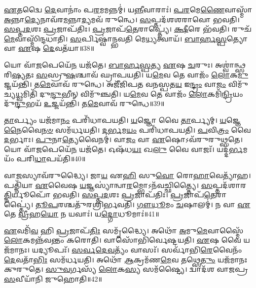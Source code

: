 \-\ul{𑌏}\-𑌤𑌦𑍍𑌵𑍈 \ul{𑌦𑍇}\-𑌵𑌾𑌨𑌾𑌂॑ 𑌪\-\ul{𑌰}\-𑌮𑌮𑌨𑍍𑌨𑌮𑍍॑।
𑌯\-\ul{𑌨𑍍𑌨𑍀}\-𑌵𑌾𑌰𑌾𑌃॑।
\-\ul{𑌪}\-\-\ul{𑌰}\-𑌮𑍇\-\ul{𑌣𑍈}\-𑌵𑌾𑌸𑍍𑌮𑌾᳴ \ul{𑌅}\-𑌨𑍍𑌨𑌾\-\ul{𑌦𑍍𑌯𑍇}\-𑌨𑌾𑌵᳴𑌰\-\ul{𑌮}\-𑌨𑍍𑌨𑌾\-\ul{𑌦𑍍𑌯}\-𑌮𑌵᳴ 𑌰𑍁𑌨𑍍𑌧𑍇।
\-\ul{𑌸}\-𑌪𑍍𑌤𑌦᳴𑌶𑌶𑌰𑌾𑌵𑍋 𑌭𑌵𑌤𑌿।
\-\ul{𑌸}\-\-\ul{𑌪𑍍𑌤}\-\-\ul{𑌦}\-𑌶𑌃 \ul{𑌪𑍍𑌰}\-𑌜𑌾\-𑌪᳴𑌤𑌿𑌃।
\-\ul{𑌪𑍍𑌰}\-𑌜𑌾𑌪᳴\-\ul{𑌤𑍇}\-𑌰𑌾𑌪𑍍𑌤𑍍𑌯𑍇॑।
\-\ul{𑌕𑍍𑌷𑍀}\-𑌰𑍇 𑌭᳴𑌵𑌤𑌿।
𑌰𑍁𑌚᳴\-\ul{𑌮𑍇}\-𑌵𑌾𑌸𑍍𑌮𑌿᳴𑌨𑍍𑌦𑌧𑌾𑌤𑌿।
\-\ul{𑌸}\-𑌰𑍍𑌪𑌿𑌷𑍍𑌵𑌾॑𑌨𑍍𑌭𑌵𑌤𑌿 𑌮𑍇\-\ul{𑌧𑍍𑌯}\-𑌤𑍍𑌵𑌾𑌯᳴।
\-\ul{𑌬𑌾}\-\-\ul{𑌰𑍍}\-\-\ul{𑌹}\-\-\ul{𑌸𑍍𑌪}\-𑌤𑍍𑌯𑍋 𑌵𑌾 \ul{𑌏}\-𑌷 \ul{𑌦𑍇}\-𑌵𑌤᳴𑌯𑌾॥38॥

𑌯𑍋 𑌵𑌾᳴\-\ul{𑌜}\-𑌪𑍇𑌯𑍇᳴\-\ul{𑌨} 𑌯𑌜᳴𑌤𑍇।
\-\ul{𑌬𑌾}\-\-\ul{𑌰𑍍}\-\-\ul{𑌹}\-\-\ul{𑌸𑍍𑌪}\-𑌤𑍍𑌯 \ul{𑌏}\-𑌷 \ul{𑌚}\-𑌰𑍁𑌃।
𑌅𑌶𑍍𑌵𑌾॑𑌨𑍍𑌥𑍍𑌸𑌰𑌿\-\ul{𑌷𑍍𑌯}\-𑌤𑌃 \ul{𑌸}\-𑌸𑍍𑌰𑍁\-\ul{𑌷}\-𑌶𑍍𑌚𑌾𑌵᳴ 𑌘𑍍𑌰𑌾𑌪𑌯𑌤𑌿।
𑌯\-\ul{𑌮𑍇}\-𑌵 𑌤𑍇 𑌵𑌾𑌜𑌂᳴ \ul{𑌲𑍋}\-𑌕\-\ul{𑌮𑍁}\-𑌜𑍍𑌜𑌯᳴𑌨𑍍𑌤𑌿।
𑌤\-\ul{𑌮𑍇}\-𑌵𑌾𑌵᳴ 𑌰𑍁𑌨𑍍𑌧𑍇।
𑌅𑌜𑍀᳴𑌜𑌿𑌪𑌤 𑌵𑌨𑌸𑍍𑌪𑌤\-\ul{𑌯} 𑌇\-\ul{𑌨𑍍𑌦𑍍𑌰𑌂} 𑌵𑌾\-\ul{𑌜𑌂} 𑌵𑌿𑌮𑍁᳴𑌚𑍍𑌯\-\ul{𑌧𑍍𑌵}\-𑌮𑌿𑌤𑌿᳴ 𑌦𑍁\-\ul{𑌨𑍍𑌦𑍁}\-𑌭𑍀𑌨𑍍 𑌵𑌿𑌮𑍁᳴𑌞𑍍𑌚𑌤𑌿।
𑌯\-\ul{𑌮𑍇}\-𑌵 𑌤𑍇 𑌵𑌾𑌜𑌂᳴ \ul{𑌲𑍋}\-𑌕𑌮𑌿᳴\-\ul{𑌨𑍍𑌦𑍍𑌰𑌿}\-𑌯𑌂 𑌦𑍁᳴\-\ul{𑌨𑍍𑌦𑍁}\-𑌭𑌯᳴ \ul{𑌉}\-𑌜𑍍𑌜𑌯᳴𑌨𑍍𑌤𑌿।
𑌤\-\ul{𑌮𑍇}\-𑌵𑌾𑌵᳴ 𑌰𑍁𑌨𑍍𑌧𑍇॥39॥

\-\ul{𑌤𑌾}\-𑌰𑍍𑌪𑍍𑌯𑌂 𑌯𑌜᳴𑌮𑌾\-\ul{𑌨𑌂} 𑌪𑌰𑌿᳴𑌧𑌾𑌪𑌯𑌤𑌿।
\-\ul{𑌯}\-𑌜𑍍𑌞𑍋 𑌵𑍈 \ul{𑌤𑌾}\-𑌰𑍍𑌪𑍍𑌯𑌮𑍍।
\-\ul{𑌯}\-𑌜𑍍𑌞𑍇\-\ul{𑌨𑍈}\-𑌵𑍈\-\ul{𑌨}\-\-\ul{𑍞} 𑌸𑌮᳴𑌰𑍍𑌧𑌯𑌤𑌿।
\-\ul{𑌦}\-\-\ul{𑌰𑍍𑌭}\-𑌮\-\ul{𑌯𑌂} 𑌪𑌰𑌿᳴𑌧𑌾𑌪𑌯𑌤𑌿।
\-\ul{𑌪}\-𑌵𑌿\-\ul{𑌤𑍍𑌰𑌂} 𑌵𑍈 \ul{𑌦}\-𑌰𑍍𑌭𑌾𑌃।
\-\ul{𑌪𑍁}\-𑌨𑌾\-\ul{𑌤𑍍𑌯𑍇}\-𑌵𑍈𑌨𑌮𑍍॑।
𑌵𑌾\-\ul{𑌜𑌂} 𑌵𑌾 \ul{𑌏}\-𑌷𑍋\-𑌽𑌵᳴𑌰𑍁𑌰𑍁𑌥𑍍𑌸𑌤𑍇।
𑌯𑍋 𑌵𑌾᳴\-\ul{𑌜}\-𑌪𑍇𑌯𑍇᳴\-\ul{𑌨} 𑌯𑌜᳴𑌤𑍇।
𑌓𑌷᳴𑌧\-\ul{𑌯𑌃} 𑌖\-\ul{𑌲𑍁} 𑌵𑍈 𑌵𑌾𑌜𑌃᳴।
𑌯𑌦𑍍𑌦᳴\-\ul{𑌰𑍍𑌭}\-𑌮𑌯𑌂᳴ 𑌪𑌰𑌿\-\ul{𑌧𑌾}\-𑌪𑌯᳴𑌤𑌿॥40॥

𑌵𑌾\-\ul{𑌜}\-𑌸𑍍𑌯𑌾𑌵᳴𑌰𑍁𑌦𑍍𑌧𑍍𑌯𑍈।
𑌜𑌾\-\ul{𑌯} 𑌏\-\ul{𑌹𑌿} 𑌸𑍁\-\ul{𑌵𑍋} 𑌰𑍋\-\ul{𑌹𑌾}\-𑌵𑍇𑌤𑍍𑌯𑌾᳴𑌹।
𑌪𑌤𑍍𑌨𑌿᳴𑌯𑌾 \ul{𑌏}\-𑌵𑍈𑌷 \ul{𑌯}\-𑌜𑍍𑌞𑌸𑍍𑌯𑌾॑𑌨𑍍𑌵𑌾\-\ul{𑌰}\-𑌮𑍍𑌭𑍋\-𑌽𑌨᳴𑌵𑌚𑍍𑌛𑌿𑌤𑍍𑌤𑍍𑌯𑍈।
\-\ul{𑌸}\-𑌪𑍍𑌤𑌦᳴𑌶𑌾𑌰\-\ul{𑌤𑍍𑌨𑌿}\-𑌰𑍍𑌯𑍂𑌪𑍋᳴ 𑌭𑌵𑌤𑌿।
\-\ul{𑌸}\-\-\ul{𑌪𑍍𑌤}\-\-\ul{𑌦}\-𑌶𑌃 \ul{𑌪𑍍𑌰}\-𑌜𑌾\-𑌪᳴𑌤𑌿𑌃।
\-\ul{𑌪𑍍𑌰}\-𑌜𑌾𑌪᳴\-\ul{𑌤𑍇}\-𑌰𑌾𑌪𑍍𑌤𑍍𑌯𑍈॑।
\-\ul{𑌤𑍂}\-\-\ul{𑌪}\-𑌰𑌶𑍍𑌚𑌤𑍁᳴𑌰𑌶𑍍𑌰𑌿𑌰𑍍𑌭𑌵𑌤𑌿।
\-\ul{𑌗𑍗}\-\-\ul{𑌧𑍂}\-𑌮𑌂 \ul{𑌚}\-𑌷𑌾𑌲𑌮𑍍॑।
𑌨 𑌵𑌾 \ul{𑌏}\-𑌤𑍇 \ul{𑌵𑍍𑌰𑍀}\-𑌹\-\ul{𑌯𑍋} 𑌨 𑌯𑌵𑌾𑌃॑।
𑌯\-\ul{𑌦𑍍𑌗𑍋}\-𑌧𑍂𑌮𑌾𑌃॑॥41॥

\-\ul{𑌏}\-𑌵𑌮𑌿᳴\-\ul{𑌵} 𑌹𑌿 \ul{𑌪𑍍𑌰}\-𑌜𑌾\-𑌪᳴\-\ul{𑌤𑌿𑌃} 𑌸𑌮𑍃᳴𑌦𑍍𑌧𑍍𑌯𑍈।
𑌅𑌥𑍋᳴ \ul{𑌅}\-𑌮𑍁\-\ul{𑌮𑍇}\-𑌵𑌾𑌸𑍍𑌮𑍈᳴ \ul{𑌲𑍋}\-𑌕𑌮𑌨𑍍𑌨᳴𑌵𑌨𑍍𑌤𑌂 𑌕𑌰𑍋𑌤𑌿।
𑌵𑌾𑌸𑍋᳴𑌭𑌿𑌰𑍍𑌵𑍇𑌷𑍍𑌟𑌯𑌤𑌿।
\-\ul{𑌏}\-𑌷 𑌵𑍈 𑌯𑌜᳴𑌮𑌾𑌨𑌃।
𑌯𑌦𑍍𑌯𑍂𑌪𑌃᳴।
\-\ul{𑌸}\-\-\ul{𑌰𑍍𑌵}\-\-\ul{𑌦𑍇}\-\-\ul{𑌵}\-𑌤𑍍𑌯𑌂᳴ 𑌵𑌾𑌸𑌃᳴।
𑌸𑌰𑍍𑌵𑌾᳴𑌭𑌿\-\ul{𑌰𑍇}\-𑌵𑍈𑌨𑌂᳴ \ul{𑌦𑍇}\-𑌵𑌤𑌾᳴\-\ul{𑌭𑌿𑌃} 𑌸𑌮᳴𑌰𑍍𑌧𑌯𑌤𑌿।
𑌅𑌥𑍋᳴ \ul{𑌆}\-𑌕𑍍𑌰𑌮᳴𑌣\-\ul{𑌮𑍇}\-𑌵 𑌤𑌥𑍍𑌸𑍇\-\ul{𑌤𑍁𑌂} 𑌯𑌜᳴𑌮𑌾𑌨𑌃 𑌕𑍁𑌰𑍁𑌤𑍇।
\-\ul{𑌸𑍁}\-\-\ul{𑌵}\-𑌰𑍍𑌗𑌸𑍍𑌯᳴ \ul{𑌲𑍋}\-𑌕\-\ul{𑌸𑍍𑌯} 𑌸𑌮᳴𑌷𑍍𑌟𑍍𑌯𑍈।
𑌦𑍍𑌵𑌾𑌦᳴𑌶 𑌵𑌾𑌜𑌪𑍍𑌰\-\ul{𑌸}\-𑌵𑍀𑌯𑌾᳴𑌨𑌿 𑌜𑍁𑌹𑍋𑌤𑌿॥42॥


